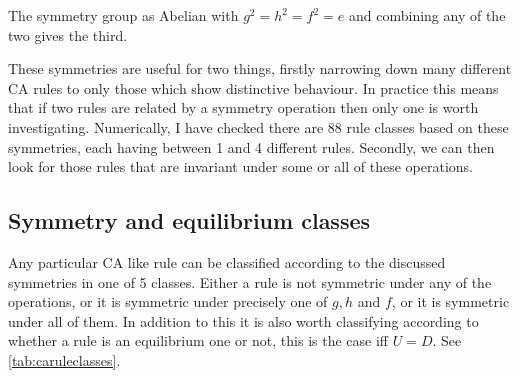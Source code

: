 \documentclass[11pt]{article}
\begin{document}
The symmetry group as Abelian with $g^2=h^2=f^2=e$ and combining any of the two gives the third.

These symmetries are useful for two things, firstly narrowing down many different CA rules to only those which show distinctive behaviour.
In practice this means that if two rules are related by a symmetry operation then only one is worth investigating.
Numerically, I have checked there are 88 rule classes based on these symmetries, each having between 1 and 4 different rules.
Secondly, we can then look for those rules that are invariant under some or all of these operations.

\subsection{Symmetry and equilibrium classes}
Any particular CA like rule can be classified according to the discussed symmetries in one of 5 classes.
Either a rule is not symmetric under any of the operations, or it is symmetric under precisely one of $g, h$ and $f$, or it is symmetric under all of them.
In addition to this it is also worth classifying according to whether a rule is an equilibrium one or not, this is the case iff $U=D$.
See \cref{tab:caruleclasses}.
\end{document}
